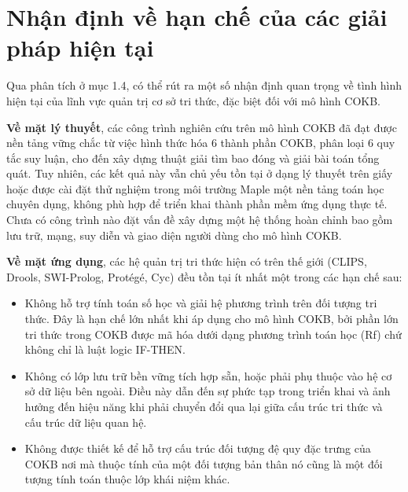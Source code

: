 \documentclass[13pt,a4paper,oneside]{extreport}
\begin{document}
\section{Nhận định về hạn chế của các giải pháp hiện tại}


Qua phân tích ở mục 1.4, có thể rút ra một số nhận định quan trọng về tình hình hiện tại của lĩnh vực quản trị cơ sở tri thức, đặc biệt đối với mô hình COKB.


\textbf{Về mặt lý thuyết}, các công trình nghiên cứu trên mô hình COKB đã đạt được nền tảng vững chắc  từ việc hình thức hóa 6 thành phần COKB, phân loại 6 quy tắc suy luận, cho đến xây dựng thuật giải tìm bao đóng và giải bài toán tổng quát. Tuy nhiên, các kết quả này vẫn chủ yếu tồn tại ở dạng lý thuyết trên giấy hoặc được cài đặt thử nghiệm trong môi trường Maple  một nền tảng toán học chuyên dụng, không phù hợp để triển khai thành phần mềm ứng dụng thực tế. Chưa có công trình nào đặt vấn đề xây dựng một hệ thống hoàn chỉnh bao gồm lưu trữ, mạng, suy diễn và giao diện người dùng cho mô hình COKB.


\textbf{Về mặt ứng dụng}, các hệ quản trị tri thức hiện có trên thế giới (CLIPS, Drools, SWI-Prolog, Protégé, Cyc) đều tồn tại ít nhất một trong các hạn chế sau:


\begin{itemize}
  \item Không hỗ trợ tính toán số học và giải hệ phương trình trên đối tượng tri thức. Đây là hạn chế lớn nhất khi áp dụng cho mô hình COKB, bởi phần lớn tri thức trong COKB được mã hóa dưới dạng phương trình toán học (Rf) chứ không chỉ là luật logic IF-THEN.
\end{itemize}



\begin{itemize}
  \item Không có lớp lưu trữ bền vững tích hợp sẵn, hoặc phải phụ thuộc vào hệ cơ sở dữ liệu bên ngoài. Điều này dẫn đến sự phức tạp trong triển khai và ảnh hưởng đến hiệu năng khi phải chuyển đổi qua lại giữa cấu trúc tri thức và cấu trúc dữ liệu quan hệ.
\end{itemize}



\begin{itemize}
  \item Không được thiết kế để hỗ trợ cấu trúc đối tượng đệ quy đặc trưng của COKB  nơi mà thuộc tính của một đối tượng bản thân nó cũng là một đối tượng tính toán thuộc lớp khái niệm khác.
\end{itemize}
\end{document}
